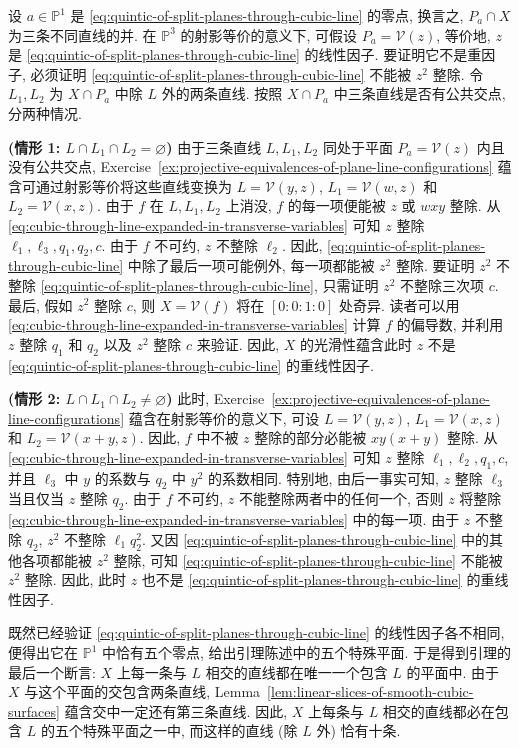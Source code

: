 \begin{Proof}
设 $a\in\mathbb{P}^{1}$ 是 \eqref{eq:quintic-of-split-planes-through-cubic-line} 的零点, 换言之, $P_{a}\cap X$ 为三条不同直线的并. 在 $\mathbb{P}^{3}$ 的射影等价的意义下, 可假设 $P_{a}=\mathcal{V}(z)$, 等价地, $z$ 是 \eqref{eq:quintic-of-split-planes-through-cubic-line} 的线性因子. 要证明它不是重因子, 必须证明 \eqref{eq:quintic-of-split-planes-through-cubic-line} 不能被 $z^{2}$ 整除. 令 $L_{1},L_{2}$ 为 $X\cap P_{a}$ 中除 $L$ 外的两条直线. 按照 $X\cap P_{a}$ 中三条直线是否有公共交点, 分两种情况.

\textbf{(情形 1: $L\cap L_{1}\cap L_{2}=\varnothing$)} 由于三条直线 $L,L_{1},L_{2}$ 同处于平面 $P_{a}=\mathcal{V}(z)$ 内且没有公共交点, Exercise~\ref{ex:projective-equivalences-of-plane-line-configurations} 蕴含可通过射影等价将这些直线变换为 $L=\mathcal{V}(y,z)$, $L_{1}=\mathcal{V}(w,z)$ 和 $L_{2}=\mathcal{V}(x,z)$. 由于 $f$ 在 $L,L_{1},L_{2}$ 上消没, $f$ 的每一项便能被 $z$ 或 $wxy$ 整除. 从 \eqref{eq:cubic-through-line-expanded-in-transverse-variables} 可知 $z$ 整除 $\ell_{1},\ell_{3},q_{1},q_{2},c$. 由于 $f$ 不可约, $z$ 不整除 $\ell_{2}$. 因此, \eqref{eq:quintic-of-split-planes-through-cubic-line} 中除了最后一项可能例外, 每一项都能被 $z^{2}$ 整除. 要证明 $z^{2}$ 不整除 \eqref{eq:quintic-of-split-planes-through-cubic-line}, 只需证明 $z^{2}$ 不整除三次项 $c$. 最后, 假如 $z^{2}$ 整除 $c$, 则 $X=\mathcal{V}(f)$ 将在 $[0:0:1:0]$ 处奇异. 读者可以用 \eqref{eq:cubic-through-line-expanded-in-transverse-variables} 计算 $f$ 的偏导数, 并利用 $z$ 整除 $q_{1}$ 和 $q_{2}$ 以及 $z^{2}$ 整除 $c$ 来验证. 因此, $X$ 的光滑性蕴含此时 $z$ 不是 \eqref{eq:quintic-of-split-planes-through-cubic-line} 的重线性因子.

\textbf{(情形 2: $L\cap L_{1}\cap L_{2}\ne\varnothing$)} 此时, Exercise~\ref{ex:projective-equivalences-of-plane-line-configurations} 蕴含在射影等价的意义下, 可设 $L=\mathcal{V}(y,z)$, $L_{1}=\mathcal{V}(x,z)$ 和 $L_{2}=\mathcal{V}(x+y,z)$. 因此, $f$ 中不被 $z$ 整除的部分必能被 $xy(x+y)$ 整除. 从 \eqref{eq:cubic-through-line-expanded-in-transverse-variables} 可知 $z$ 整除 $\ell_{1},\ell_{2},q_{1},c$, 并且 $\ell_{3}$ 中 $y$ 的系数与 $q_{2}$ 中 $y^{2}$ 的系数相同. 特别地, 由后一事实可知, $z$ 整除 $\ell_{3}$ 当且仅当 $z$ 整除 $q_{2}$. 由于 $f$ 不可约, $z$ 不能整除两者中的任何一个, 否则 $z$ 将整除 \eqref{eq:cubic-through-line-expanded-in-transverse-variables} 中的每一项. 由于 $z$ 不整除 $q_{2}$, $z^{2}$ 不整除 $\ell_{1}q_{2}^{2}$. 又因 \eqref{eq:quintic-of-split-planes-through-cubic-line} 中的其他各项都能被 $z^{2}$ 整除, 可知 \eqref{eq:quintic-of-split-planes-through-cubic-line} 不能被 $z^{2}$ 整除. 因此, 此时 $z$ 也不是 \eqref{eq:quintic-of-split-planes-through-cubic-line} 的重线性因子.

既然已经验证 \eqref{eq:quintic-of-split-planes-through-cubic-line} 的线性因子各不相同, 便得出它在 $\mathbb{P}^{1}$ 中恰有五个零点, 给出引理陈述中的五个特殊平面. 于是得到引理的最后一个断言: $X$ 上每一条与 $L$ 相交的直线都在唯一一个包含 $L$ 的平面中. 由于 $X$ 与这个平面的交包含两条直线, Lemma~\ref{lem:linear-slices-of-smooth-cubic-surfaces} 蕴含交中一定还有第三条直线. 因此, $X$ 上每条与 $L$ 相交的直线都必在包含 $L$ 的五个特殊平面之一中, 而这样的直线 (除 $L$ 外) 恰有十条.
\end{Proof}

